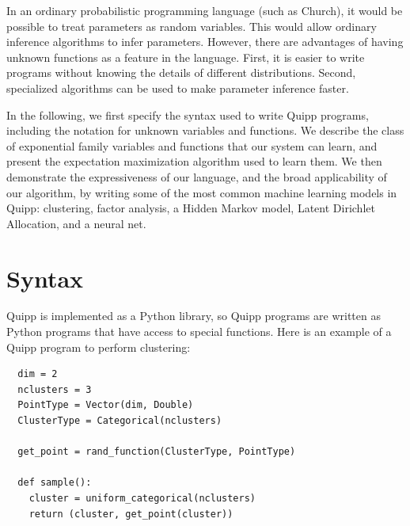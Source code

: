 \documentclass[proceed]{article}
\begin{document}

  In an ordinary probabilistic programming language (such as Church),
  it would be possible to treat parameters as random variables.  This
  would allow ordinary inference algorithms to infer parameters.  However,
  there are advantages of having unknown functions as a feature
  in the language.
  First, it is easier to
  write programs without knowing the details of different distributions.
  Second, specialized algorithms can be used to make parameter inference
  faster.



  In the following, we first specify the syntax used to write Quipp programs,
  including the notation for unknown variables and functions.
  We describe the class of exponential family variables and functions that our system can learn,
  and present the expectation maximization algorithm used to learn them.
  We then demonstrate the expressiveness of our language, and the broad
  applicability of our algorithm, by writing some of the most common machine learning models
  in Quipp: clustering, factor analysis, a Hidden Markov model, Latent Dirichlet Allocation, and
  a neural net.
  
  \section{Syntax}

  Quipp is implemented as a Python library, so Quipp programs are written as Python programs that have access
  to special functions.  Here is an example of a Quipp program to perform clustering:


  \begin{verbatim}
  dim = 2
  nclusters = 3
  PointType = Vector(dim, Double)
  ClusterType = Categorical(nclusters)

  get_point = rand_function(ClusterType, PointType)

  def sample():
    cluster = uniform_categorical(nclusters)
    return (cluster, get_point(cluster))
  \end{verbatim}
\end{document}
